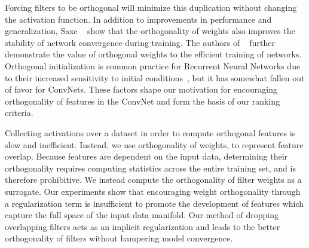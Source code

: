 Forcing filters to be orthogonal will minimize this duplication without changing the activation function.
In addition to improvements in performance and generalization, Saxe \etal ~\cite{Saxe2013ExactST} show that the orthogonality of weights also improves the stability of network convergence during training.
The authors of ~\cite{Xie2017AllYN, Xiao2018DynamicalIA} further demonstrate the value of orthogonal weights to the efficient training of networks.
Orthogonal initialization is common practice for Recurrent Neural Networks due to their increased sensitivity to initial conditions~\cite{Vorontsov2017OnOA}, but it has somewhat fallen out of favor for ConvNets.
These factors shape our motivation for encouraging orthogonality of features in the ConvNet and form the basis of our ranking criteria.

Collecting activations over a dataset in order to compute orthogonal features is slow and inefficient. Instead, we use orthogonality of weights, to represent feature overlap.
Because features are dependent on the input data, determining their orthogonality requires computing statistics across the entire training set, and is therefore prohibitive.  
We instead compute the orthogonality of filter weights as a surrogate.
Our experiments show that encouraging weight orthogonality through a regularization term is insufficient to promote the development of features which capture the full space of the input data manifold.
Our method of dropping overlapping filters acts as an implicit regularization and leads to the better orthogonality of filters without hampering model convergence.


